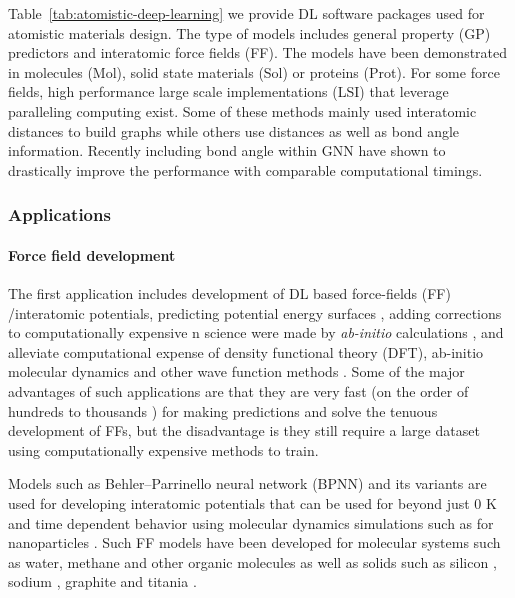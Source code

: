 \documentclass[pdflatex,sn-mathphys]{sn-jnl}%
\theoremstyle{thmstyleone}%
\theoremstyle{thmstyletwo}%
\theoremstyle{thmstylethree}%
\begin{document}
Table~\ref{tab:atomistic-deep-learning} we provide DL software packages used for atomistic materials design. The type of models includes general property (GP) predictors and interatomic force fields (FF). The models have been demonstrated in molecules (Mol), solid state materials (Sol) or proteins (Prot). For some force fields, high performance large scale implementations (LSI) that leverage paralleling computing exist. Some of these methods mainly used interatomic distances to build graphs while others use distances as well as bond angle information. Recently including bond angle within GNN have shown to drastically improve the performance with comparable computational timings.
 
 
 
\subsubsection{Applications}


 \paragraph{Force field development}
 The first application includes development of DL based force-fields (FF) \cite{smith2017ani,behler2011atom}/interatomic potentials, predicting potential energy surfaces \cite{zhang2018deep}, adding corrections to computationally expensive n science 
were made by \emph{ab-initio} calculations \cite{mcgibbon2017improving}, and alleviate computational expense of density functional theory (DFT), ab-initio molecular dynamics and other wave function methods  \cite{mills2017deep}. Some of the major advantages of such applications are that they are very fast (on the order of hundreds to thousands \cite{wang2019deep}) for making predictions and solve the tenuous development of FFs, but the disadvantage is they still require a large dataset using computationally expensive methods to train. 
 
 Models such as Behler–Parrinello neural network (BPNN) and its variants \cite{behler2007generalized,Ko2021} are used for developing interatomic potentials that can be used for beyond just 0 K and time dependent behavior using molecular dynamics simulations such as for nanoparticles \cite{weinreichproperties}. Such FF models have been developed for molecular systems such as water, methane and other organic molecules \cite{WANG2018178,Ko2021} as well as solids such as silicon \cite{behler2007generalized}, sodium \cite{eshet2010ab}, graphite \cite{khaliullin2010graphite} and titania \cite{artrith2016implementation}. 
 
\end{document}
